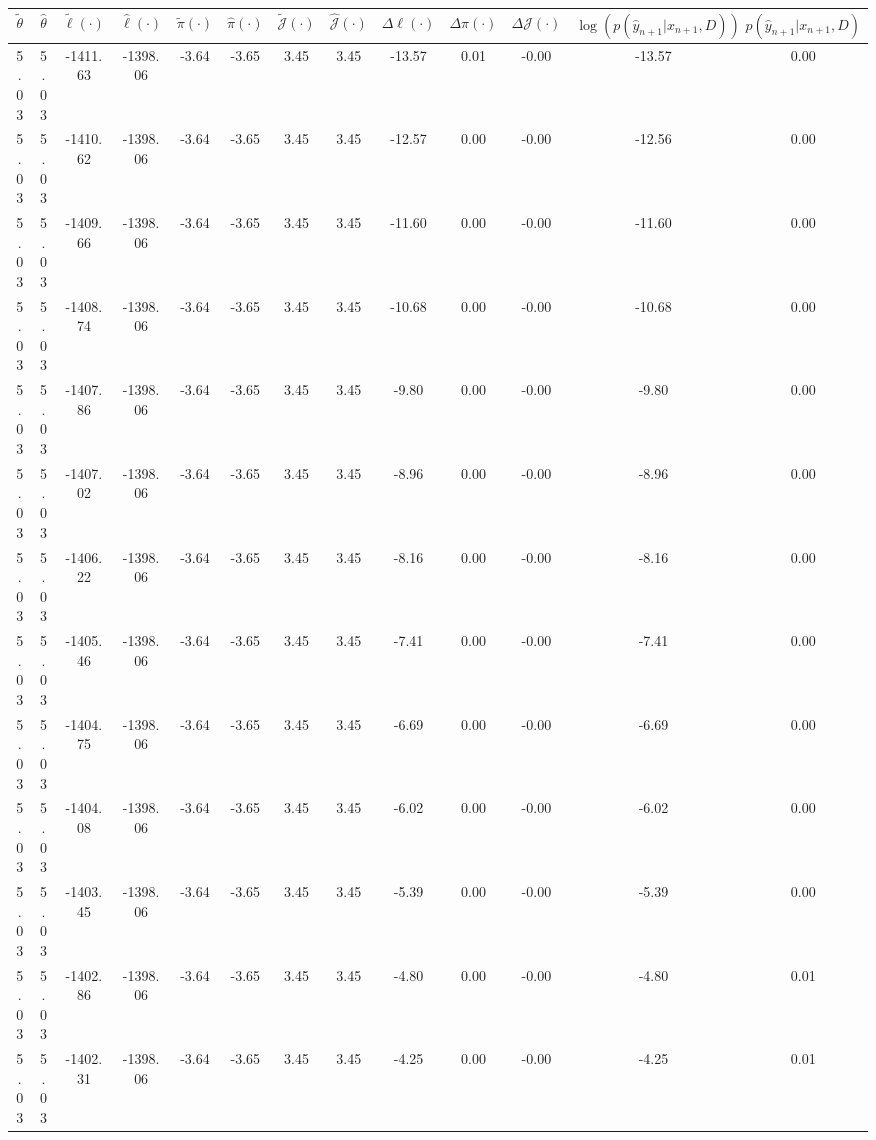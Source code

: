 \begin{table}[htbp]
        \centering
        \tiny
        \begin{adjustbox}{angle=90}
            \begin{tabular}{|c|c|c|c|c|c|c|c|c|c|c|c|c|}
                \hline
                 $\tilde{\theta}$ & $\hat{\theta}$ & $\tilde{\ell}(\cdot)$ & $\hat{\ell}(\cdot)$ & $\tilde{\pi}(\cdot)$ & $\hat{\pi}(\cdot)$ & $\tilde{\mathcal{J}}(\cdot)$ & $\hat{\mathcal{J}}(\cdot)$ & $\Delta \ell(\cdot)$ & $\Delta \pi(\cdot)$ & $\Delta \mathcal{J}(\cdot)$ & $\log(p(\hat{y}_{n+1}|x_{n+1}, D))$ & $p(\hat{y}_{n+1}|x_{n+1}, D)$ \\
                \hline
                 5.03 & 5.03 & -1411.63 & -1398.06 & -3.64 & -3.65 & 3.45 & 3.45 & -13.57 & 0.01 & -0.00 & -13.57 & 0.00\\ \hline
 5.03 & 5.03 & -1410.62 & -1398.06 & -3.64 & -3.65 & 3.45 & 3.45 & -12.57 & 0.00 & -0.00 & -12.56 & 0.00\\ \hline
 5.03 & 5.03 & -1409.66 & -1398.06 & -3.64 & -3.65 & 3.45 & 3.45 & -11.60 & 0.00 & -0.00 & -11.60 & 0.00\\ \hline
 5.03 & 5.03 & -1408.74 & -1398.06 & -3.64 & -3.65 & 3.45 & 3.45 & -10.68 & 0.00 & -0.00 & -10.68 & 0.00\\ \hline
 5.03 & 5.03 & -1407.86 & -1398.06 & -3.64 & -3.65 & 3.45 & 3.45 & -9.80 & 0.00 & -0.00 & -9.80 & 0.00\\ \hline
 5.03 & 5.03 & -1407.02 & -1398.06 & -3.64 & -3.65 & 3.45 & 3.45 & -8.96 & 0.00 & -0.00 & -8.96 & 0.00\\ \hline
 5.03 & 5.03 & -1406.22 & -1398.06 & -3.64 & -3.65 & 3.45 & 3.45 & -8.16 & 0.00 & -0.00 & -8.16 & 0.00\\ \hline
 5.03 & 5.03 & -1405.46 & -1398.06 & -3.64 & -3.65 & 3.45 & 3.45 & -7.41 & 0.00 & -0.00 & -7.41 & 0.00\\ \hline
 5.03 & 5.03 & -1404.75 & -1398.06 & -3.64 & -3.65 & 3.45 & 3.45 & -6.69 & 0.00 & -0.00 & -6.69 & 0.00\\ \hline
 5.03 & 5.03 & -1404.08 & -1398.06 & -3.64 & -3.65 & 3.45 & 3.45 & -6.02 & 0.00 & -0.00 & -6.02 & 0.00\\ \hline
 5.03 & 5.03 & -1403.45 & -1398.06 & -3.64 & -3.65 & 3.45 & 3.45 & -5.39 & 0.00 & -0.00 & -5.39 & 0.00\\ \hline
 5.03 & 5.03 & -1402.86 & -1398.06 & -3.64 & -3.65 & 3.45 & 3.45 & -4.80 & 0.00 & -0.00 & -4.80 & 0.01\\ \hline
 5.03 & 5.03 & -1402.31 & -1398.06 & -3.64 & -3.65 & 3.45 & 3.45 & -4.25 & 0.00 & -0.00 & -4.25 & 0.01\\ \hline

\end{tabular}
\end{adjustbox}
\end{table}
